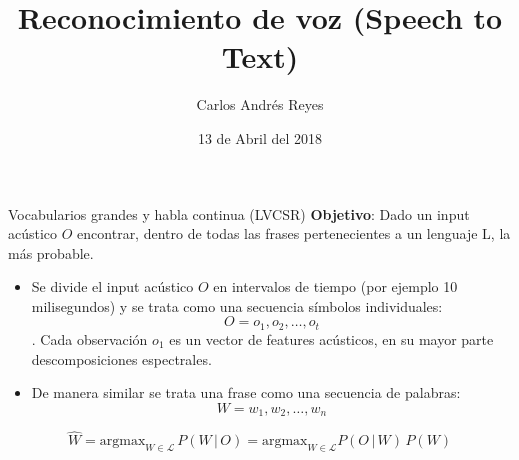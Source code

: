 \documentclass[11pt,xcolor={dvipsnames}]{beamer}
\author{Carlos Andrés Reyes}
\title{Reconocimiento de voz (Speech to Text)}
\date{13 de Abril del 2018}
\begin{document}
{ %
    \begin{frame}[plain]
     \end{frame}
}
\begin{frame}
\titlepage
\end{frame}



\begin{frame}{Vocabularios grandes y habla continua (LVCSR)}
\textbf{Objetivo}: Dado un input acústico $O$ encontrar, dentro de todas las frases pertenecientes a un lenguaje L, la más probable.
\begin{itemize}
\item Se divide el input acústico $O$ en intervalos de tiempo (por ejemplo 10 milisegundos) y se trata como una secuencia símbolos individuales:
$$O= o_1, o_2,\ldots, o_t$$.
Cada observación $o_1$ es un vector de features acústicos, en su mayor parte descomposiciones espectrales. 
\item De manera similar se trata una frase como una secuencia de palabras: $$W=w_1,w_2,\ldots,w_n$$
\end{itemize}
$$ \hat{W} = \text{argmax}_{W \in \mathcal{L}}\,P(W\,|\,O) = \text{argmax}_{W \in \mathcal{L}} P(O\,|\,W)\,P(W) $$
\end{frame}
\end{document}
